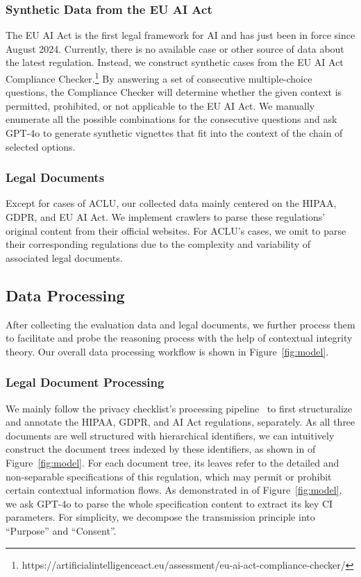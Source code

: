\subsubsection{Synthetic Data from the EU AI Act}
\label{sec: ai act}
The EU AI Act is the first legal framework for AI and has just been in force since August 2024.
Currently, there is no available case or other source of data about the latest regulation.
Instead, we construct synthetic cases from the EU AI Act Compliance Checker.\footnote{https://artificialintelligenceact.eu/assessment/eu-ai-act-compliance-checker/}
By answering a set of consecutive multiple-choice questions, the Compliance Checker will determine whether the given context is permitted, prohibited, or not applicable to the EU AI Act.
We manually enumerate all the possible combinations for the consecutive questions and ask GPT-4o to generate synthetic vignettes that fit into the context of the chain of selected options.



\subsubsection{Legal Documents}

Except for cases of ACLU, our collected data mainly centered on the HIPAA, GDPR, and EU AI Act.
We implement crawlers to parse these regulations' original content from their official websites.
For ACLU's cases, we omit to parse their corresponding regulations due to the complexity and variability of associated legal documents.


\subsection{Data Processing}
After collecting the evaluation data and legal documents, we further process them to facilitate and probe the reasoning process with the help of contextual integrity theory.
Our overall data processing workflow is shown in Figure~\ref{fig:model}.

\subsubsection{Legal Document Processing}
\label{sec: legal doc process}
We mainly follow the privacy checklist's processing pipeline~\cite{li-2024-privacychecklist} to first structuralize and annotate the HIPAA, GDPR, and AI Act regulations, separately.
As all three documents are well structured with hierarchical identifiers, we can intuitively construct the document trees indexed by these identifiers, as shown in  of Figure~\ref{fig:model}.
For each document tree, its leaves refer to the detailed and non-separable specifications of this regulation, which may permit or prohibit certain contextual information flows.
As demonstrated in  of Figure~\ref{fig:model}, we ask GPT-4o to parse the whole specification content to extract its key CI parameters.
For simplicity, we decompose the transmission principle into ``Purpose'' and ``Consent''.



